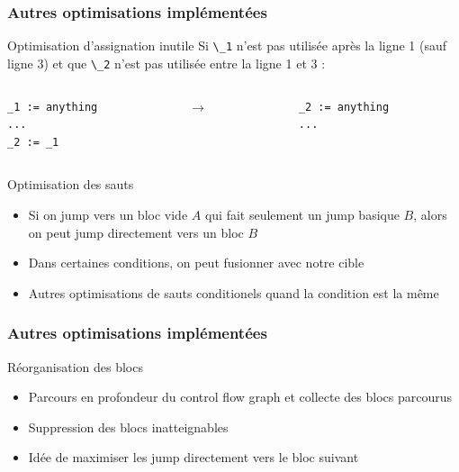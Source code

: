 \documentclass{beamer}
\newcommand*{\local}[1]{\lstinline|\_#1|}
\begin{document}
\begin{frame}[fragile]
    \frametitle{Autres optimisations implémentées}
    \begin{block}{Optimisation d'assignation inutile}
        Si \local{1} n'est pas utilisée après la ligne 1 (sauf ligne 3) et que \local{2} 
        n'est pas utilisée entre la ligne 1 et 3 :
        \begin{columns}
            \begin{column}{.40\textwidth}
                    \begin{lstlisting}
_1 := anything
...
_2 := _1
                    \end{lstlisting}
            \end{column}

            \begin{column}{.04\textwidth}
                $\rightarrow$
            \end{column}
            \begin{column}{.40\textwidth}
                    \begin{lstlisting}
_2 := anything
...
                    \end{lstlisting}
            \end{column}
        \end{columns}
    \end{block}
    \pause
    \begin{block}{Optimisation des sauts}
        \begin{itemize}
            \item Si on jump vers un bloc vide $A$ qui fait seulement un jump basique $B$, alors on peut jump directement vers un bloc $B$ 
            \item Dans certaines conditions, on peut fusionner avec notre cible
            \item Autres optimisations de sauts conditionels quand la condition est la même
        \end{itemize}
    \end{block}
\end{frame}

\begin{frame}
    \frametitle{Autres optimisations implémentées}

    \begin{block}{Réorganisation des blocs}
        \begin{itemize}
            \item Parcours en profondeur du control flow graph et collecte des blocs parcourus
            \item Suppression des blocs inatteignables
            \item Idée de maximiser les jump directement vers le bloc suivant
        \end{itemize}
        
    \end{block}
\end{frame}
\end{document}
